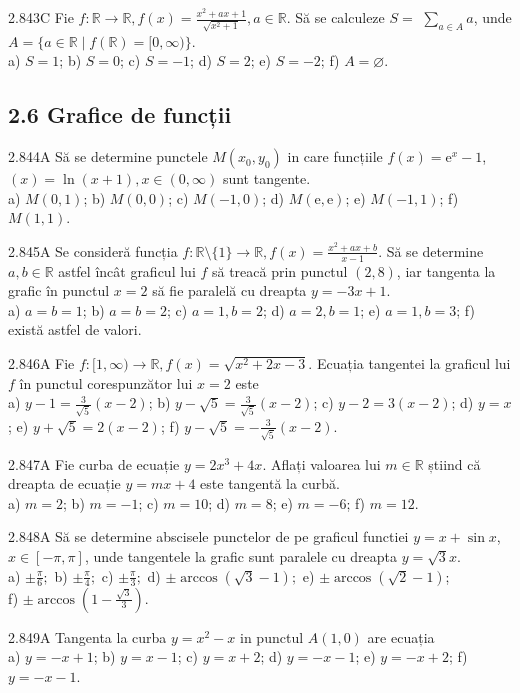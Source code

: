 \documentclass[11pt]{article}
\begin{document}
2.843C Fie $f: \mathbb{R} \rightarrow \mathbb{R}, f(x)=\frac{x^{2}+a x+1}{\sqrt{x^{2}+1}}, a \in \mathbb{R}$. Să se calculeze $S=$ $\sum_{a \in A} a$, unde $A=\{a \in \mathbb{R} \mid f(\mathbb{R})=[0, \infty)\}$.\\ a) $S=1$; b) $S=0$; c) $S=-1$; d) $S=2$; e) $S=-2$; f) $A=\varnothing$.

\subsection*{2.6 Grafice de funcții}
2.844A Să se determine punctele $M\left(x_{0}, y_{0}\right)$ in care funcțiile $f(x)=\mathrm{e}^{x}-1$,$(x)=\ln (x+1), x \in(0, \infty)$ sunt tangente.\\ a) $M(0,1)$; b) $M(0,0)$; c) $M(-1,0)$; d) $M(\mathrm{e}, \mathrm{e})$; e) $M(-1,1)$; f) $M(1,1)$.

2.845A Se consideră funcția $f: \mathbb{R} \setminus\{1\} \rightarrow \mathbb{R}, f(x)=\frac{x^{2}+a x+b}{x-1}$. Să se determine $a, b \in \mathbb{R}$ astfel încât graficul lui $f$ să treacă prin punctul $(2,8)$, iar tangenta la grafic în punctul $x=2$ să fie paralelă cu dreapta $y=-3 x+1$.\\ a) $a=b=1$; b) $a=b=2$; c) $a=1, b=2$; d) $a=2, b=1$; e) $a=1, b=3$; f) există astfel de valori.

2.846A Fie $f: [1,\infty) \rightarrow \mathbb{R}, f(x)=\sqrt{x^{2}+2 x-3}$. Ecuația tangentei la graficul lui $f$ în punctul corespunzător lui $x=2$ este\\ a) $y-1=\frac{3}{\sqrt{5}}(x-2)$; b) $y-\sqrt{5}=\frac{3}{\sqrt{5}}(x-2)$; c) $y-2=3(x-2)$; d) $y=x$; e) $y+\sqrt{5}=2(x-2)$; f) $y-\sqrt{5}=-\frac{3}{\sqrt{5}}(x-2)$.

2.847A Fie curba de ecuație $y=2 x^{3}+4 x$. Aflați valoarea lui $m \in \mathbb{R}$ știind că dreapta de ecuație $y=m x+4$ este tangentă la curbă.\\ a) $m=2$; b) $m=-1$; c) $m=10$; d) $m=8$; e) $m=-6$; f) $m=12$.

2.848A Să se determine abscisele punctelor de pe graficul functiei $y=x+\sin x$, $x \in[-\pi, \pi]$, unde tangentele la grafic sunt paralele cu dreapta $y=\sqrt{3} x$.\\ a) $\pm \frac{\pi}{6} ;$ b) $\pm \frac{\pi}{4} ;$ c) $\pm \frac{\pi}{3} ;$ d) $\pm \arccos (\sqrt{3}-1) ;$ e) $\pm \arccos (\sqrt{2}-1)$;\\ f) $\pm \arccos \left(1-\frac{\sqrt{3}}{3}\right)$.

2.849A Tangenta la curba $y=x^{2}-x$ in punctul $A(1,0)$ are ecuația\\ a) $y=-x+1$; b) $y=x-1$; c) $y=x+2$; d) $y=-x-1$; e) $y=-x+2$; f) $y=-x-1$.
\end{document}

